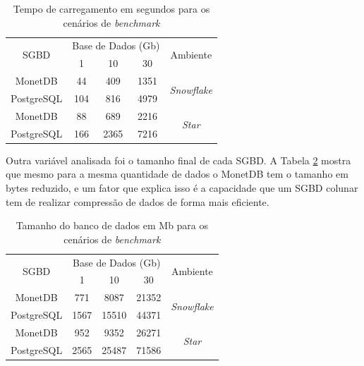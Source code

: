 \documentclass[12pt]{article}
\begin{document}
\begin{table}[htpb]
    \centering
    \caption{Tempo de carregamento em segundos para os cenários de \textit{benchmark}}
    \label{tab:carregamento}
    \begin{tabular}{c|ccc|c}
    \hline
    \multirow{2}{*}{SGBD} & \multicolumn{3}{c|}{Base de Dados (Gb)} & \multirow{2}{*}{Ambiente}  \\
                          & 1           & 10          & 30          &                            \\ \hline
    MonetDB               & 44          & 409         & 1351        & \multirow{2}{*}{\textit{Snowflake}} \\
    PostgreSQL            & 104         & 816         & 4979        &                            \\ \hline
    MonetDB               & 88          & 689         & 2216        & \multirow{2}{*}{\textit{Star}}      \\
    PostgreSQL            & 166         & 2365        & 7216        &                            \\ \hline
    \end{tabular}
\end{table}

Outra variável analisada foi o tamanho final de cada SGBD. A Tabela \ref{tab:carregamento_size} 
mostra que mesmo para a mesma quantidade de dados o MonetDB tem o tamanho em bytes reduzido, e um 
fator que explica isso é a capacidade que um SGBD colunar tem de realizar compressão 
de dados de forma mais eficiente.

\begin{table}[htpb]
    \centering
    \caption{Tamanho do banco de dados em Mb para os cenários de \textit{benchmark}}
    \label{tab:carregamento_size}
    \begin{tabular}{c|ccc|c}
        \hline
        \multirow{2}{*}{SGBD} & \multicolumn{3}{c|}{Base de Dados (Gb)} & \multirow{2}{*}{Ambiente}  \\
                              & 1           & 10          & 30          &                            \\ \hline
        MonetDB               & 771         & 8087        & 21352       & \multirow{2}{*}{\textit{Snowflake}} \\
        PostgreSQL            & 1567        & 15510       & 44371       &                            \\ \hline
        MonetDB               & 952         & 9352        & 26271       & \multirow{2}{*}{\textit{Star}}      \\
        PostgreSQL            & 2565        & 25487       & 71586       &                            \\ \hline
        \end{tabular}
    \end{table}
\end{document}

